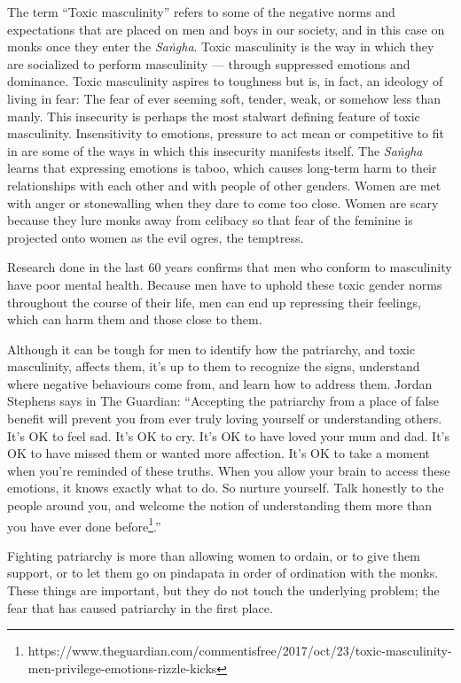 The term ``Toxic masculinity'' refers to some of the negative norms and expectations that are placed on men and boys in our society, and in this case on monks once they enter the {\em Saṅgha}. Toxic masculinity is the way in which they are socialized to perform masculinity — through suppressed emotions and dominance. Toxic masculinity aspires to toughness but is, in fact, an ideology of living in fear: The fear of ever seeming soft, tender, weak, or somehow less than manly. This insecurity is perhaps the most stalwart defining feature of toxic masculinity. Insensitivity to emotions, pressure to act mean or competitive to fit in are some of the ways in which this insecurity manifests itself. The {\em Saṅgha} learns that expressing emotions is taboo, which causes long-term harm to their relationships with each other and with people of other genders. Women are met with anger or stonewalling when they dare to come too close. Women are scary because they lure monks away from celibacy so that fear of the feminine is projected onto women as the evil ogres, the temptress.

Research done in the last 60 years confirms that men who conform to masculinity have poor mental health. Because men have to uphold these toxic gender norms throughout the course of their life, men can end up repressing their feelings, which can harm them and those close to them.

Although it can be tough for men to identify how the patriarchy, and toxic masculinity, affects them, it's up to them to recognize the signs, understand where negative behaviours come from, and learn how to address them. Jordan Stephens says in The Guardian: ``Accepting the patriarchy from a place of false benefit will prevent you from ever truly loving yourself or understanding others. It's OK to feel sad. It's OK to cry. It's OK to have loved your mum and dad. It's OK to have missed them or wanted more affection. It's OK to take a moment when you're reminded of these truths. When you allow your brain to access these emotions, it knows exactly what to do. So nurture yourself. Talk honestly to the people around you, and welcome the notion of understanding them more than you have ever done before\footnote{https://www.theguardian.com/commentisfree/2017/oct/23/toxic-masculinity-men-privilege-emotions-rizzle-kicks}.''

Fighting patriarchy is more than allowing women to ordain, or to give them support, or to let them go on pindapata in order of ordination with the monks. These things are important, but they do not touch the underlying problem; the fear that has caused patriarchy in the first place.

